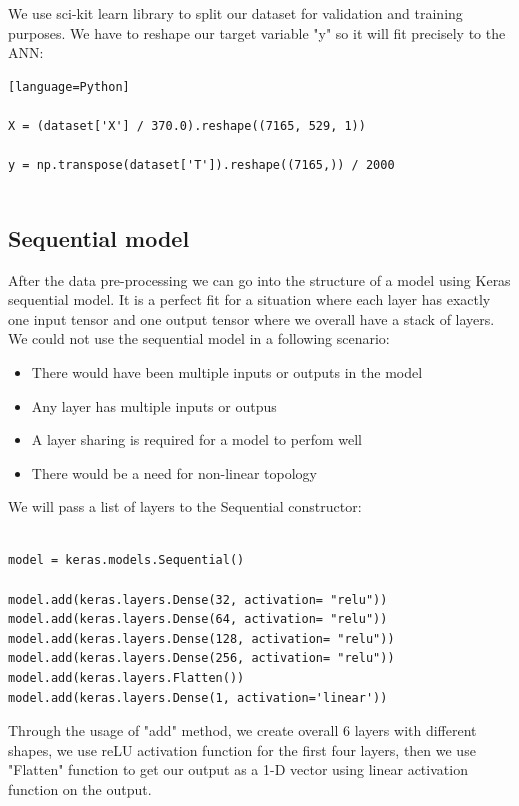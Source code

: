 \documentclass[a4paper,oneside,openright,11pt]{book}
\begin{document}
We use sci-kit learn library to split our dataset for validation and training purposes. We have to reshape our target variable "y" so it will fit precisely to the ANN:

\begin{verbatim}[language=Python]

X = (dataset['X'] / 370.0).reshape((7165, 529, 1)) 

y = np.transpose(dataset['T']).reshape((7165,)) / 2000 


\end{verbatim}

\subsection{Sequential model}

After the data pre-processing we can go into the structure of a model using Keras sequential model. It is a perfect fit for a situation where each layer has exactly one input tensor and one output tensor where we overall have a stack of layers. We could not use the sequential model in a following scenario:

\begin{itemize}
    \item There would have been multiple inputs or outputs in the model
    \item Any layer has multiple inputs or outpus
    \item A layer sharing is required for a model to perfom well
    \item There would be a need for non-linear topology
\end{itemize}

We will pass a list of layers to the Sequential constructor:

\begin{verbatim}

model = keras.models.Sequential()

model.add(keras.layers.Dense(32, activation= "relu"))
model.add(keras.layers.Dense(64, activation= "relu"))
model.add(keras.layers.Dense(128, activation= "relu"))
model.add(keras.layers.Dense(256, activation= "relu"))
model.add(keras.layers.Flatten())
model.add(keras.layers.Dense(1, activation='linear'))

\end{verbatim}

Through the usage of "add" method, we create overall 6 layers with different shapes, we use reLU activation function for the first four layers, then we use "Flatten" function to get our output as a 1-D vector using linear activation function on the output. 
\end{document}
